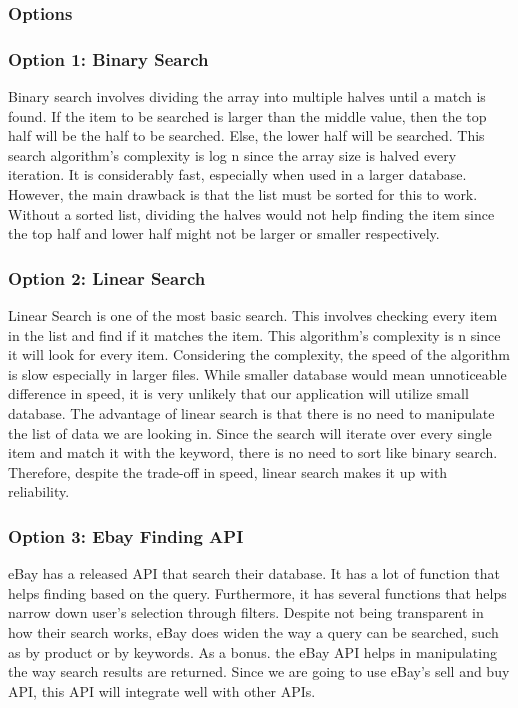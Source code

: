 \documentclass[journal,compsoc, 10pt, draftclsnofoot, onecolumn]{IEEEtran}
\begin{document}
\subsubsection{Options}
\subsubsection*{Option 1: Binary Search}
Binary search involves dividing the array into multiple halves until a match is
found. If the item to be searched is larger than the middle value, then the top half
will be the half to be searched. Else, the lower half will be searched. This search
algorithm's complexity is log n since the array size is halved every iteration. It is
considerably fast, especially when used in a larger database. However, the main
drawback is that the list must be sorted for this to work. Without a sorted list,
dividing the halves would not help finding the item since the top half and lower half
might not be larger or smaller respectively.

\subsubsection*{Option 2: Linear Search}
Linear Search is one of the most basic search. This involves checking every item in
the list and find if it matches the item. This algorithm's complexity is n since it
will look for every item. Considering the complexity, the speed of the algorithm is
slow especially in larger files. While smaller database would mean unnoticeable
difference in speed, it is very unlikely that our application will utilize small
database. The advantage of linear search is that there is no need to manipulate the
list of data we are looking in. Since the search will iterate over every single item
and match it with the keyword, there is no need to sort like binary search.
Therefore, despite the trade-off in speed, linear search makes it up with
reliability.

\subsubsection*{Option 3: Ebay Finding API}
eBay has a released API that search their database. It has a lot of function that
helps finding based on the query. Furthermore, it has several functions that helps
narrow down user's selection through filters. Despite not being transparent in how
their search works, eBay does widen the way a query can be searched, such as by
product or by keywords. As a bonus. the eBay API helps in manipulating the way search
results are returned. Since we are going to use eBay's sell and buy API, this API
will integrate well with other APIs.
\end{document}

